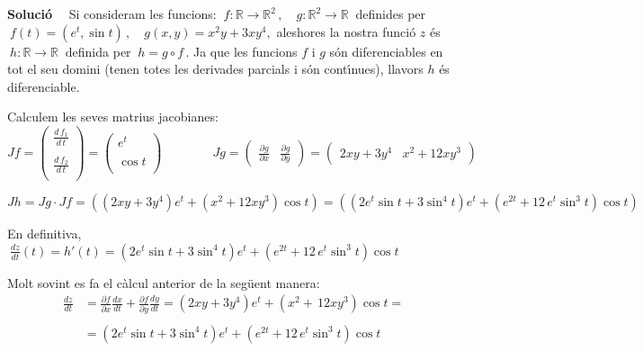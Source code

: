 \documentclass[12pt]{article}
\newcommand{\solucio}{\textbf{Soluci{\'o}}\ \ }
\newcommand{\R}{\mathbb{R}}
\begin{document}
\solucio
Si consideram les funcions: $\ f:\R\longrightarrow \R^2\,,\quad g:\R^2\longrightarrow \R\ $ definides per $\ f(t)=(e^t,\sin t)\,, \quad g(x,y)=x^2y+3xy^4,$ aleshores la nostra funci{\'o} $z$ {\'e}s $\ h:\R\longrightarrow \R\ $ definida per $\ h=g\circ f\,.$ Ja que les funcions $f$ i $g$ s{\'o}n diferenciables en tot el seu domini (tenen totes les derivades parcials i s{\'o}n cont{\'\i}nues), llavors  $h$ {\'e}s diferenciable.

Calculem les seves matrius jacobianes:
\begin{equation*}
Jf=\left(\begin{array} {c}
  \displaystyle\frac{d\,f_1}{d\, t} \\
   \\
   \displaystyle\frac{d\, f_2}{d\, t} \\
   \end{array} \right)=\left(\begin{array} {c}
   e^t \\
   \\
   \cos t \\
   \end{array} \right)
   \qquad\qquad Jg=\left(\begin{array} {cc}
   \displaystyle\frac{\partial g}{\partial x} & \displaystyle\frac{\partial g}{\partial y}
\end{array} \right)=\left(\begin{array} {cc}
 2xy+3y^4  & x^2+12xy^3
\end{array} \right)
\end{equation*}


\begin{equation*}
Jh=Jg\cdot Jf = (
(2xy+3y^4)e^t+(x^2+12xy^3)\cos t)= ( (2e^t\sin
t+3\sin^4t)e^t+(e^{2t}+12\,e^t \sin^3t)\cos t)
\end{equation*}

En definitiva, $\ \displaystyle\frac{dz}{dt}(t)=h'(t)=(2e^t\sin
t+3\sin^4t)e^t+(e^{2t}+12\,e^t\sin^3t)\cos t$

\vspace{0.4cm}
Molt sovint es fa el c{\`a}lcul anterior de la seg{\"u}ent manera:
\begin{align*}
\frac{dz}{dt} & = \frac{\partial f}{\partial x} \frac{dx}{dt} +
\frac{\partial f}{\partial y} \frac{dy}{dt} =
(2xy+3y^4)e^t+(x^2+\,12xy^3)\cos t= \\
&\\ & = (2e^t\sin
t+3\sin^4t)e^t+(e^{2t}+12\,e^t\sin^3t)\cos t
\end{align*}
\end{document}
